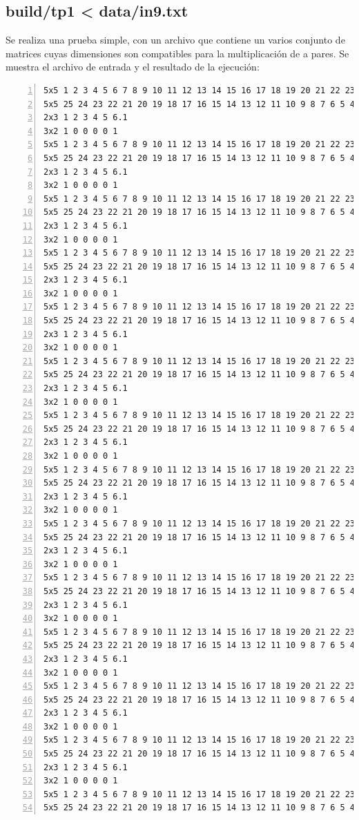 \documentclass[a4paper,10pt]{article}
\begin{document}
\subsection{build/tp1 < data/in9.txt}
Se realiza una prueba simple, con un archivo que contiene un varios conjunto de matrices cuyas dimensiones son compatibles para la multiplicaci\'on de a pares. Se muestra el archivo de entrada y el resultado de la ejecuci\'on:

\begin{lstlisting}[numbers=left,language=bash]
5x5 1 2 3 4 5 6 7 8 9 10 11 12 13 14 15 16 17 18 19 20 21 22 23 24 25
5x5 25 24 23 22 21 20 19 18 17 16 15 14 13 12 11 10 9 8 7 6 5 4 3 2 1.1
2x3 1 2 3 4 5 6.1
3x2 1 0 0 0 0 1
5x5 1 2 3 4 5 6 7 8 9 10 11 12 13 14 15 16 17 18 19 20 21 22 23 24 25
5x5 25 24 23 22 21 20 19 18 17 16 15 14 13 12 11 10 9 8 7 6 5 4 3 2 1.1
2x3 1 2 3 4 5 6.1
3x2 1 0 0 0 0 1
5x5 1 2 3 4 5 6 7 8 9 10 11 12 13 14 15 16 17 18 19 20 21 22 23 24 25
5x5 25 24 23 22 21 20 19 18 17 16 15 14 13 12 11 10 9 8 7 6 5 4 3 2 1.1
2x3 1 2 3 4 5 6.1
3x2 1 0 0 0 0 1
5x5 1 2 3 4 5 6 7 8 9 10 11 12 13 14 15 16 17 18 19 20 21 22 23 24 25
5x5 25 24 23 22 21 20 19 18 17 16 15 14 13 12 11 10 9 8 7 6 5 4 3 2 1.1
2x3 1 2 3 4 5 6.1
3x2 1 0 0 0 0 1
5x5 1 2 3 4 5 6 7 8 9 10 11 12 13 14 15 16 17 18 19 20 21 22 23 24 25
5x5 25 24 23 22 21 20 19 18 17 16 15 14 13 12 11 10 9 8 7 6 5 4 3 2 1.1
2x3 1 2 3 4 5 6.1
3x2 1 0 0 0 0 1
5x5 1 2 3 4 5 6 7 8 9 10 11 12 13 14 15 16 17 18 19 20 21 22 23 24 25
5x5 25 24 23 22 21 20 19 18 17 16 15 14 13 12 11 10 9 8 7 6 5 4 3 2 1.1
2x3 1 2 3 4 5 6.1
3x2 1 0 0 0 0 1
5x5 1 2 3 4 5 6 7 8 9 10 11 12 13 14 15 16 17 18 19 20 21 22 23 24 25
5x5 25 24 23 22 21 20 19 18 17 16 15 14 13 12 11 10 9 8 7 6 5 4 3 2 1.1
2x3 1 2 3 4 5 6.1
3x2 1 0 0 0 0 1
5x5 1 2 3 4 5 6 7 8 9 10 11 12 13 14 15 16 17 18 19 20 21 22 23 24 25
5x5 25 24 23 22 21 20 19 18 17 16 15 14 13 12 11 10 9 8 7 6 5 4 3 2 1.1
2x3 1 2 3 4 5 6.1
3x2 1 0 0 0 0 1
5x5 1 2 3 4 5 6 7 8 9 10 11 12 13 14 15 16 17 18 19 20 21 22 23 24 25
5x5 25 24 23 22 21 20 19 18 17 16 15 14 13 12 11 10 9 8 7 6 5 4 3 2 1.1
2x3 1 2 3 4 5 6.1
3x2 1 0 0 0 0 1
5x5 1 2 3 4 5 6 7 8 9 10 11 12 13 14 15 16 17 18 19 20 21 22 23 24 25
5x5 25 24 23 22 21 20 19 18 17 16 15 14 13 12 11 10 9 8 7 6 5 4 3 2 1.1
2x3 1 2 3 4 5 6.1
3x2 1 0 0 0 0 1
5x5 1 2 3 4 5 6 7 8 9 10 11 12 13 14 15 16 17 18 19 20 21 22 23 24 25
5x5 25 24 23 22 21 20 19 18 17 16 15 14 13 12 11 10 9 8 7 6 5 4 3 2 1.1
2x3 1 2 3 4 5 6.1
3x2 1 0 0 0 0 1
5x5 1 2 3 4 5 6 7 8 9 10 11 12 13 14 15 16 17 18 19 20 21 22 23 24 25
5x5 25 24 23 22 21 20 19 18 17 16 15 14 13 12 11 10 9 8 7 6 5 4 3 2 1.1
2x3 1 2 3 4 5 6.1
3x2 1 0 0 0 0 1
5x5 1 2 3 4 5 6 7 8 9 10 11 12 13 14 15 16 17 18 19 20 21 22 23 24 25
5x5 25 24 23 22 21 20 19 18 17 16 15 14 13 12 11 10 9 8 7 6 5 4 3 2 1.1
2x3 1 2 3 4 5 6.1
3x2 1 0 0 0 0 1
5x5 1 2 3 4 5 6 7 8 9 10 11 12 13 14 15 16 17 18 19 20 21 22 23 24 25
5x5 25 24 23 22 21 20 19 18 17 16 15 14 13 12 11 10 9 8 7 6 5 4 3 2 1.1
\end{lstlisting}
\end{document}
